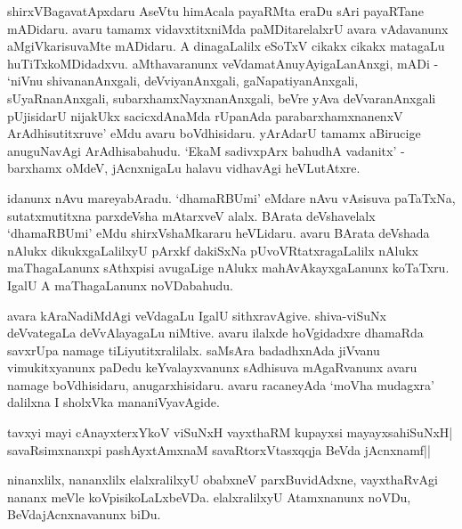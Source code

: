 shirxVBagavatApxdaru AseVtu himAcala payaRMta eraDu sAri payaRTane mADidaru. avaru tamamx vidavxtitxniMda paMDitarelalxrU avara vAdavanunx aMgiVkarisuvaMte mADidaru. A dinagaLalilx eSoTxV cikakx cikakx matagaLu huTiTxkoMDidadxvu. aMthavaranunx veVdamatAnuyAyigaLanAnxgi, mADi - `niVnu shivananAnxgali, deVviyanAnxgali, gaNapatiyanAnxgali, sUyaRnanAnxgali, subarxhamxNayxnanAnxgali, beVre yAva deVvaranAnxgali pUjisidarU nijakUkx sacicxdAnaMda rUpanAda 
parabarxhamxnanenxV ArAdhisutitxruve' eMdu avaru boVdhisidaru. yArAdarU tamamx aBirucige anuguNavAgi ArAdhisabahudu. `EkaM sadivxpArx bahudhA vadanitx' - barxhamx oMdeV, jAcnxnigaLu halavu vidhavAgi heVLutAtxre.

idanunx nAvu mareyabAradu. `dhamaRBUmi' eMdare nAvu vAsisuva paTaTx‌Na, sutatxmutitxna parxdeVsha mAtarxveV alalx. BArata deVshavelalx `dhamaRBUmi' eMdu shirxVshaMkararu heVLidaru. avaru BArata deVshada nAlukx dikukxgaLalilxyU pArxkf dakiSxNa pUvoVRtatxragaLalilx nAlukx maThagaLanunx sAthxpisi avugaLige nAlukx mahAvAkayxgaLanunx koTaTxru. IgalU A maThagaLanunx noVDabahudu.

avara kAraNadiMdAgi veVdagaLu IgalU sithxravAgive. shiva-viSuNx deVvategaLa deVvAlayagaLu niMtive. avaru ilalxde hoVgidadxre dhamaRda savxrUpa namage tiLiyutitxralilalx. saMsAra badadhxnAda jiVvanu vimukitxyanunx paDedu keYvalayxvanunx sAdhisuva mAgaRvanunx avaru namage boVdhisidaru, anugarxhisidaru. avaru racaneyAda `moVha mudagxra' dalilxna I sholxVka mananiVyavAgide.

\begin{shloka}
tavxyi mayi cAnayxterxYkoV viSuNxH vayxthaRM kupayxsi mayayxsahiSuNxH|\\
savaRsimxnanxpi pashAyxtAmxnaM savaRtorxVtasxqqja BeVda jAcnxnamf||
\end{shloka}

ninanxlilx, nananxlilx elalxralilxyU obabxneV parxBuvidAdxne, vayxthaRvAgi nananx meVle koVpisikoLaLxbeVDa. elalxralilxyU Atamxnanunx noVDu, BeVdajAcnxnavanunx biDu.



\endchapter

